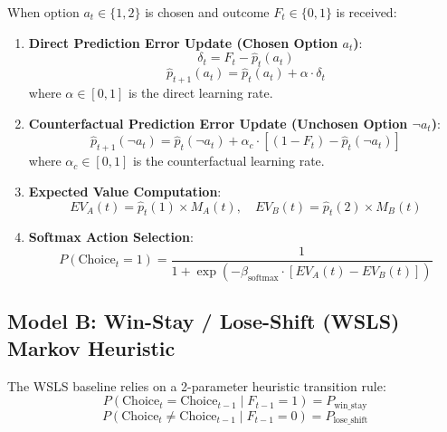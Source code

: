 \documentclass[11pt,a4paper]{article}
\begin{document}
When option $a_t \in \{1, 2\}$ is chosen and outcome $F_t \in \{0, 1\}$ is received:
\begin{enumerate}
    \item \textbf{Direct Prediction Error Update (Chosen Option $a_t$)}:
    \begin{equation}
    \delta_t = F_t - \hat{p}_t(a_t)
    \end{equation}
    \begin{equation}
    \hat{p}_{t+1}(a_t) = \hat{p}_t(a_t) + \alpha \cdot \delta_t
    \end{equation}
    where $\alpha \in [0, 1]$ is the direct learning rate.
    
    \item \textbf{Counterfactual Prediction Error Update (Unchosen Option $\neg a_t$)}:
    \begin{equation}
    \hat{p}_{t+1}(\neg a_t) = \hat{p}_t(\neg a_t) + \alpha_c \cdot \left[ (1 - F_t) - \hat{p}_t(\neg a_t) \right]
    \end{equation}
    where $\alpha_c \in [0, 1]$ is the counterfactual learning rate.
    
    \item \textbf{Expected Value Computation}:
    \begin{equation}
    EV_A(t) = \hat{p}_t(1) \times M_A(t), \quad EV_B(t) = \hat{p}_t(2) \times M_B(t)
    \end{equation}
    
    \item \textbf{Softmax Action Selection}:
    \begin{equation}
    P(\text{Choice}_t = 1) = \frac{1}{1 + \exp\left(-\beta_{\text{softmax}} \cdot [EV_A(t) - EV_B(t)]\right)}
    \end{equation}
\end{enumerate}

\subsection{Model B: Win-Stay / Lose-Shift (WSLS) Markov Heuristic}
The WSLS baseline relies on a 2-parameter heuristic transition rule:
\begin{equation}
P(\text{Choice}_t = \text{Choice}_{t-1} \mid F_{t-1} = 1) = P_{\text{win\_stay}}
\end{equation}
\begin{equation}
P(\text{Choice}_t \neq \text{Choice}_{t-1} \mid F_{t-1} = 0) = P_{\text{lose\_shift}}
\end{equation}
\end{document}
